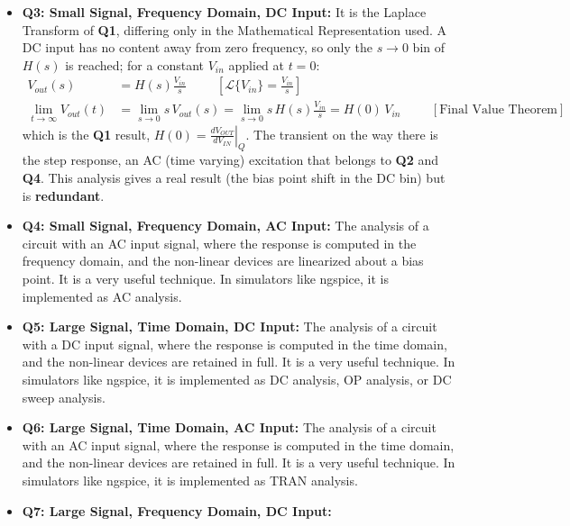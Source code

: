 \begin{itemize}
      Laplace Transform of \textbf{Q4}:
      \(V_{out}(t) = \mathcal{L}^{-1}\{H(s) V_{in}(s)\}\).
    \item \textbf{Q3: Small Signal, Frequency Domain, DC Input:}
      It is the Laplace Transform of \textbf{Q1}, differing only in the
      Mathematical Representation used. A DC input has no content away from
      zero frequency, so only the \(s \to 0\) bin of \(H(s)\) is reached; for a
      constant \(V_{in}\) applied at \(t = 0\):
      \begin{align*}
        V_{out}(s) &= H(s)\frac{V_{in}}{s} \hspace{1cm} [\mathcal{L}\{V_{in}\} = \tfrac{V_{in}}{s}] \\
        \lim_{t \to \infty} V_{out}(t) &= \lim_{s \to 0} s\, V_{out}(s) = \lim_{s \to 0} s\, H(s)\frac{V_{in}}{s} = H(0)\, V_{in} \hspace{1cm} [\text{Final Value Theorem}]
      \end{align*}
      which is the \textbf{Q1} result, \(H(0) = \left.\frac{dV_{OUT}}{dV_{IN}}\right|_{Q}\).
      The transient on the way there is the step response, an AC (time
      varying) excitation that belongs to \textbf{Q2} and \textbf{Q4}. This
      analysis gives a real result (the bias point shift in the DC bin) but is
      \textbf{redundant}.
    \item \textbf{Q4: Small Signal, Frequency Domain, AC Input:}
      The analysis of a circuit with an AC
      input signal, where the response is computed in the frequency
      domain, and the non-linear devices are linearized about a bias
      point. It is a very useful technique. In simulators like ngspice, it
      is implemented as AC analysis.
    \item \textbf{Q5: Large Signal, Time Domain, DC Input:}
      The analysis of a circuit with a DC input
      signal, where the response is computed in the time domain, and the
      non-linear devices are retained in full. It is a very useful
      technique. In simulators like ngspice, it is implemented as DC
      analysis, OP analysis, or DC sweep analysis.
    \item \textbf{Q6: Large Signal, Time Domain, AC Input:}
      The analysis of a circuit with an AC input
      signal, where the response is computed in the time domain, and the
      non-linear devices are retained in full. It is a very useful
      technique. In simulators like ngspice, it is implemented as TRAN
      analysis.
    \item \textbf{Q7: Large Signal, Frequency Domain, DC Input:}

\end{itemize}

